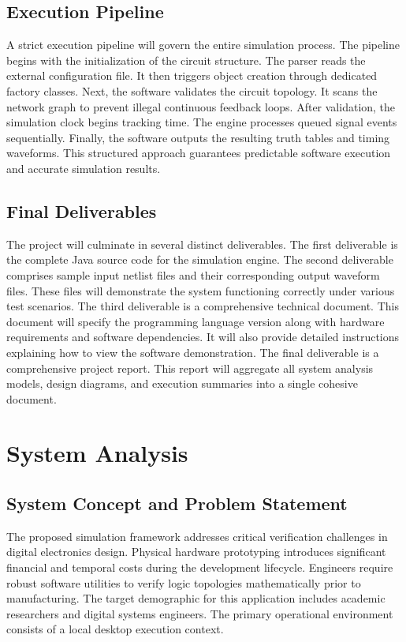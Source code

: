 \documentclass[12pt, a4paper]{article}
\begin{document}
\subsection{Execution Pipeline}
A strict execution pipeline will govern the entire simulation process. The pipeline begins with the initialization of the circuit structure. The parser reads the external configuration file. It then triggers object creation through dedicated factory classes. Next, the software validates the circuit topology. It scans the network graph to prevent illegal continuous feedback loops. After validation, the simulation clock begins tracking time. The engine processes queued signal events sequentially. Finally, the software outputs the resulting truth tables and timing waveforms. This structured approach guarantees predictable software execution and accurate simulation results.

\subsection{Final Deliverables}
The project will culminate in several distinct deliverables. The first deliverable is the complete Java source code for the simulation engine. The second deliverable comprises sample input netlist files and their corresponding output waveform files. These files will demonstrate the system functioning correctly under various test scenarios. The third deliverable is a comprehensive technical document. This document will specify the programming language version along with hardware requirements and software dependencies. It will also provide detailed instructions explaining how to view the software demonstration. The final deliverable is a comprehensive project report. This report will aggregate all system analysis models, design diagrams, and execution summaries into a single cohesive document.

\newpage

\section{System Analysis}

\subsection{System Concept and Problem Statement}
The proposed simulation framework addresses critical verification challenges in digital electronics design. Physical hardware prototyping introduces significant financial and temporal costs during the development lifecycle. Engineers require robust software utilities to verify logic topologies mathematically prior to manufacturing. The target demographic for this application includes academic researchers and digital systems engineers. The primary operational environment consists of a local desktop execution context. 
\end{document}
